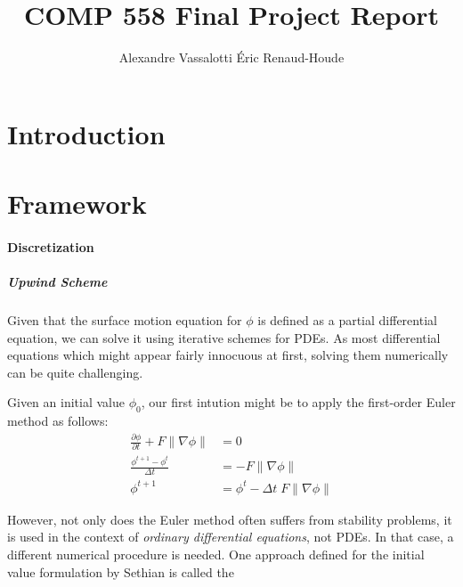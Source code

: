\documentclass{article}
\author{Alexandre Vassalotti \quad \'{E}ric Renaud-Houde}
\title{COMP 558 Final Project Report}
\begin{document}
\maketitle
\section{Introduction}

\section{Framework}

\paragraph{Discretization}
\subparagraph{Upwind Scheme}

Given that the surface motion equation \cite{moler2003nineteen} for $\phi$ is
defined as a partial differential equation, we can solve it using iterative
schemes for PDEs. As most differential equations which might appear fairly
innocuous at first, solving them numerically can be quite challenging.

Given an initial value $\phi_0$, our first intution might be to apply the
first-order Euler method as follows:
\begin{align}
  \frac{\partial \phi}{\partial t} + F \|\nabla \phi\| &= 0 \\
  \frac{\phi^{t+1} - \phi^{t}}{\Delta t} &=  -F \|\nabla \phi\| \\
  \phi^{t+1} &= \phi^{t} - \Delta t \; F \|\nabla \phi\| 
\end{align}

However, not only does the Euler method often suffers from stability problems,
it is used in the context of \textit{ordinary differential equations}, not
PDEs. In that case, a different numerical procedure is needed.  One approach
defined for the initial value formulation by Sethian is called the



\end{document}
